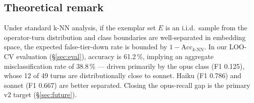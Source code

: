 \subsection{Theoretical remark}

Under standard k-NN analysis, if the exemplar set \(E\) is an
i.i.d.\ sample from the operator-turn distribution and class boundaries
are well-separated in embedding space, the expected false-tier-down
rate is bounded by \(1 - \text{Acc}_{k\text{-NN}}\).  In our
LOO-CV evaluation (§\ref{sec:eval}), accuracy is 61.2\,\%, implying
an aggregate misclassification rate of 38.8\,\% — driven primarily by
the opus class (F1 0.125), whose 12 of 49 turns are distributionally
close to sonnet.  Haiku (F1 0.786) and sonnet (F1 0.667) are
better separated.  Closing the opus-recall gap is the primary v2 target
(§\ref{sec:future}).
